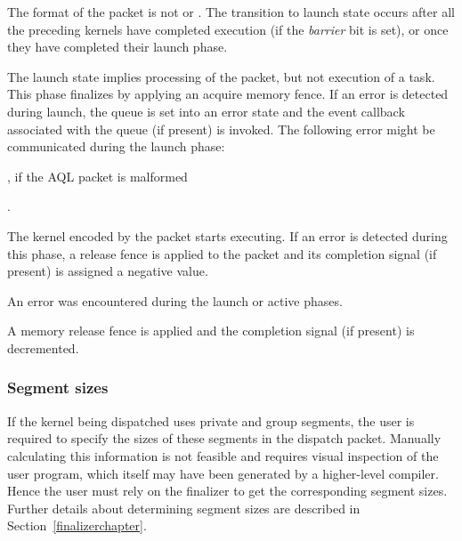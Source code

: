 \documentclass[final]{book}
\newcommand{\reffld}[1]{\textit{#1}}
\begin{document}
\begin{description}[leftmargin=0cm, labelindent=0cm]
\item[Queued] The format of the packet is not
   or
  . The transition to launch state occurs
  after all the preceding kernels have completed execution (if the
  \reffld{barrier} bit is set), or once they have completed their launch phase.

\item[Launch] The launch state implies processing of the packet, but not
  execution of a task. This phase finalizes by applying an acquire memory fence.
  If an error is detected during launch, the queue is set into an error state
  and the event callback associated with the queue (if present) is invoked. The
  following error might be communicated during the launch
  phase:\begin{inparaenum}[a\upshape)]\item
    , if the AQL packet is
    malformed\end{inparaenum}.

\item[Active] The kernel encoded by the packet starts executing. If an error is
  detected during this phase, a release fence is applied to the packet and its
  completion signal (if present) is assigned a negative value.

\item[Error] An error was encountered during the launch or active phases.

\item[Complete] A memory release fence is applied and the completion signal (if
  present) is decremented.
\end{description}

\subsubsection{Segment sizes}\label{segment-sizes}

If the kernel being dispatched uses private and group segments, the user is
required to specify the sizes of these segments in the dispatch
packet. Manually calculating this information is not feasible and requires
visual inspection of the user program, which itself may have been generated by a
higher-level compiler. Hence the user must rely on the finalizer to get the
corresponding segment sizes. Further details about determining segment sizes are
described in Section~\ref{finalizerchapter}.
\end{document}
